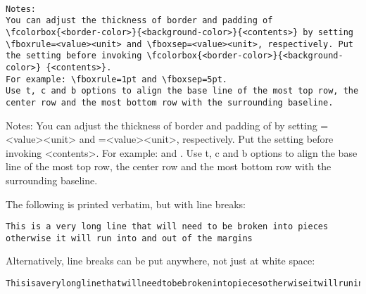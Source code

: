\documentclass{article}
\begin{document}
\lipsum[1]

\medskip

\noindent{}\hfill

\medskip
\lipsum[4]

\begin{Verbatim}[breaklines=true, breakanywhere=true]




Notes:
You can adjust the thickness of border and padding of
\fcolorbox{<border-color>}{<background-color>}{<contents>} by setting \fboxrule=<value><unit> and \fboxsep=<value><unit>, respectively. Put the setting before invoking \fcolorbox{<border-color>}{<background-color>} {<contents>}. 
For example: \fboxrule=1pt and \fboxsep=5pt.
Use t, c and b options to align the base line of the most top row, the center row and the most bottom row with the surrounding baseline.
\end{Verbatim}

\noindent\makebox[\linewidth]{\rule{\paperwidth}{0.4pt}}
\begin{spverbatim}
Notes:
You can adjust the thickness of border and padding of
  by setting \fboxrule=<value><unit> and \fboxsep=<value><unit>, respectively. Put the setting before invoking  {<contents>}. 
For example: \fboxrule=1pt and \fboxsep=5pt.
Use t, c and b options to align the base line of the most top row, the center row and the most bottom row with the surrounding baseline.
\end{spverbatim}
\noindent\makebox[\linewidth]{\rule{\paperwidth}{0.4pt}}
The following is printed verbatim, but with line breaks:
\begin{Verbatim}[breaklines=true]
This is a very long line that will need to be broken into pieces otherwise it will run into and out of the margins
\end{Verbatim}
\noindent\makebox[\linewidth]{\rule{\paperwidth}{0.4pt}}
Alternatively, line breaks can be put anywhere, not just at white space:
\begin{Verbatim}[breaklines=true, breakanywhere=true]
Thisisaverylonglinethatwillneedtobebrokenintopiecesotherwiseitwillrunintoandoutofthemargins
\end{Verbatim}
\noindent\makebox[\linewidth]{\rule{\paperwidth}{0.4pt}}
\end{document}

